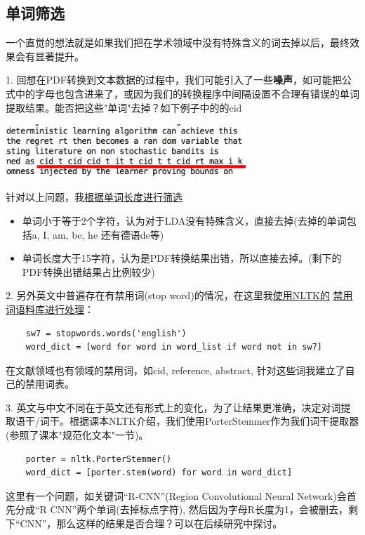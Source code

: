 \documentclass{article}
\begin{document}
\subsection{单词筛选}
一个直觉的想法就是如果我们把在学术领域中没有特殊含义的词去掉以后，最终效果会有显著提升。

1.	回想在PDF转换到文本数据的过程中，我们可能引入了一些\textbf{噪声}，如可能把公式中的字母也包含进来了，或因为我们的转换程序中间隔设置不合理有错误的单词提取结果。能否把这些"单词"去掉？如下例子中的的cid

\begin{center}
\includegraphics[height = 2cm]{section3/5}
\end{center}

针对以上问题，我\underline{根据单词长度进行筛选}
\begin{itemize}
	\item	单词小于等于2个字符，认为对于LDA没有特殊含义，直接去掉(去掉的单词包括a, I, am, be, he 还有德语de等)
	\item	单词长度大于15字符，认为是PDF转换结果出错，所以直接去掉。(剩下的PDF转换出错结果占比例较少)
\end{itemize}

2.	另外英文中普遍存在有禁用词(stop word)的情况，在这里我\underline{使用NLTK的} \underline{禁用词语料库进行处理}：
\begin{lstlisting}
	sw7 = stopwords.words('english')
	word_dict = [word for word in word_list if word not in sw7]
\end{lstlisting}

在文献领域也有领域的禁用词，如cid, reference, abstract, 针对这些词我建立了自己的禁用词表。

3.	英文与中文不同在于英文还有形式上的变化，为了让结果更准确，决定对词提取语干/词干。根据课本NLTK介绍，我们使用PorterStemmer作为我们词干提取器(参照了课本"规范化文本"一节)。
\begin{lstlisting}
	porter = nltk.PorterStemmer()
	word_dict = [porter.stem(word) for word in word_dict]
\end{lstlisting}

这里有一个问题，如关键词``R-CNN''(Region Convolutional Neural Network)会首先分成``R CNN''两个单词(去掉标点字符), 然后因为字母R长度为1，会被删去，剩下``CNN''，那么这样的结果是否合理？可以在后续研究中探讨。
\end{document}
